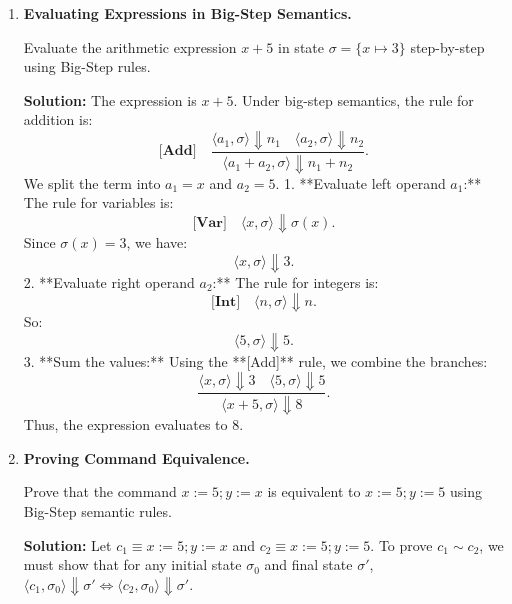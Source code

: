 \documentclass[12pt, a4paper]{book}
\begin{document}
\begin{problembox}
\begin{enumerate}[label=\textbf{E\arabic*.}]
  \item \textbf{Evaluating Expressions in Big-Step Semantics.}
  
        Evaluate the arithmetic expression $x + 5$ in state $\sigma = \{x \mapsto 3\}$ step-by-step using Big-Step rules.
        
        \textbf{Solution:}
        The expression is $x + 5$.
        Under big-step semantics, the rule for addition is:
        \[
          \textbf{[Add]} \quad \frac{\langle a_1, \sigma \rangle \Downarrow n_1 \quad \langle a_2, \sigma \rangle \Downarrow n_2}{\langle a_1 + a_2, \sigma \rangle \Downarrow n_1 + n_2}.
        \]
        We split the term into $a_1 = x$ and $a_2 = 5$.
        1. **Evaluate left operand $a_1$:**
           The rule for variables is:
           \[
             \textbf{[Var]} \quad \langle x, \sigma \rangle \Downarrow \sigma(x).
           \]
           Since $\sigma(x) = 3$, we have:
           \[
             \langle x, \sigma \rangle \Downarrow 3.
           \]
        2. **Evaluate right operand $a_2$:**
           The rule for integers is:
           \[
             \textbf{[Int]} \quad \langle n, \sigma \rangle \Downarrow n.
           \]
           So:
           \[
             \langle 5, \sigma \rangle \Downarrow 5.
           \]
        3. **Sum the values:**
           Using the **[Add]** rule, we combine the branches:
           \[
             \frac{\langle x, \sigma \rangle \Downarrow 3 \quad \langle 5, \sigma \rangle \Downarrow 5}{\langle x + 5, \sigma \rangle \Downarrow 8}.
           \]
        Thus, the expression evaluates to $8$.
        
  \item \textbf{Proving Command Equivalence.}
  
        Prove that the command $x := 5 ; y := x$ is equivalent to $x := 5 ; y := 5$ using Big-Step semantic rules.
        
        \textbf{Solution:}
        Let $c_1 \equiv x := 5 ; y := x$ and $c_2 \equiv x := 5 ; y := 5$.
        To prove $c_1 \sim c_2$, we must show that for any initial state $\sigma_0$ and final state $\sigma'$, $\langle c_1, \sigma_0 \rangle \Downarrow \sigma' \iff \langle c_2, \sigma_0 \rangle \Downarrow \sigma'$.
        

\end{enumerate}
\end{problembox}
\end{document}

